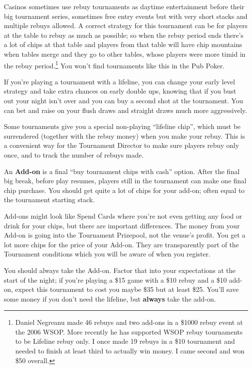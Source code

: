 Casinos sometimes use rebuy tournaments as daytime entertainment
before their big tournament series, sometimes free entry events
but with very short stacks and multiple rebuys allowed. A correct
strategy for this tournament can be for players at the table
to rebuy as much as possible; so when the rebuy period ends there's
a lot of chips at that table and players from that table will
have chip mountains when tables merge and they go to
other tables, whose players were more timid in the rebuy
period.\footnote{Daniel Negreanu made 46 rebuys and two add-ons
  in a \$1000 rebuy event at the 2006 WSOP. More recently he has
  supported WSOP rebuy tournaments to be Lifeline rebuy only. I once
  made 19 rebuys in a \$10 tournament and needed to finish at least
  third to actually win money. I came second and won \$50 overall.} You
won't find tournaments like this in the Pub Poker.

If you're playing a tournament with a lifeline, you can change
your early level strategy and take extra chances on early
double ups, knowing that if you bust out your night isn't over and
you can buy a second shot at the tournament. You can bet and raise
on your flush draws and straight draws much more aggressively.

Some tournaments give you a special non-playing ``lifeline chip'',
which must be surrendered (together with the rebuy money) when you
make your rebuy. This is a convenient way for the Tournament
Director to make sure players rebuy only once, and to track the number
of rebuys made.

An \textbf{Add-on} is a final ``buy tournament chips with cash''
option. After the final big break, before play resumes, players still
in the tournament can make one final chip purchase. You should get
quite a lot of chips for your add-on; often equal to the tournament
starting stack.

Add-ons might look like Spend Cards where you're not even
getting any food or drink for your chips, but there are important
differences. The money from your Add-on is going into the Tournament
Prizepool, not the venue's profit. You get a lot more chips for
the price of your Add-on. They are transparently part of the
Tournament conditions which you will be aware of when you register.

You should always take the Add-on. Factor that into your expectations
at the start of the night; if you're playing a \$15 game with a \$10
rebuy and a \$10 add-on, expect this tournament to cost you maybe
\$35 but at least \$25. You'll save some money if you don't
need the lifeline, but \textbf{always} take the add-on.

